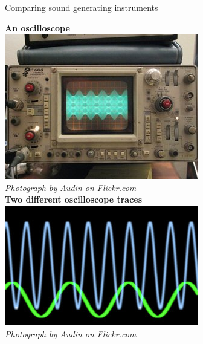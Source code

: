 \begin{activity}{Comparing sound generating instruments}
\begin{minipage}{.5\textwidth}
\end{minipage}
\begin{minipage}{.5\textwidth}
\begin{center}
\textbf{An oscilloscope}\\
\includegraphics[width=.8\textwidth]{photos/oscilloscope_Audin_Flickr.jpg}\\
\textsl{Photograph by Audin on Flickr.com}\\
\textbf{Two different oscilloscope traces}\\
\includegraphics[width=.8\textwidth]{photos/oscilloscopetrace_Creativity103_Flickr.jpg}\\
\textsl{Photograph by Audin on Flickr.com}\\
\end{center}
\end{minipage}

\begin{minipage}{.5\textwidth}
 	

\end{minipage}
\end{activity}
